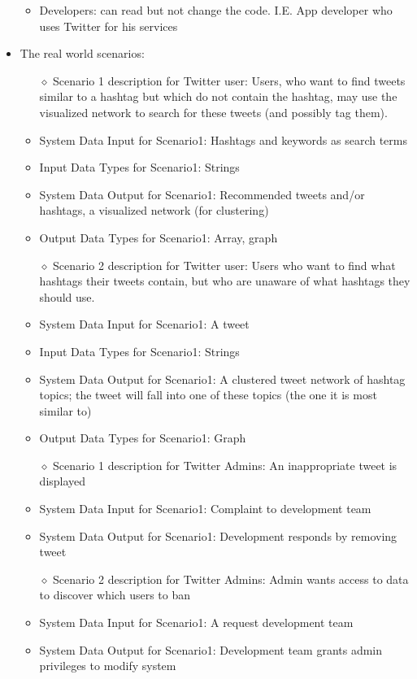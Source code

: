 \documentclass[10pt]{article}
\begin{document}
\begin{itemize}
\begin{itemize}
\item{Developers: can read but not change the code. I.E. App developer who uses Twitter for his services}

\end{itemize}
\item{The real world scenarios: }
	\begin{itemize} 
	\item[$\diamond$]{Scenario 1 description for Twitter user: }
	Users, who want to find tweets similar to a hashtag but which do not contain the hashtag, may use the visualized network to search for these tweets (and possibly tag them).
	\item{System Data Input for Scenario1: }
	Hashtags and keywords as search terms
	\item{Input Data Types for Scenario1: }
	Strings
	\item{System Data Output for Scenario1: }
	Recommended tweets and/or hashtags, a visualized network (for clustering)
	\item{Output Data Types for Scenario1: }
	Array, graph
	\end{itemize}

	\begin{itemize} 
	\item[$\diamond$]{Scenario 2 description for Twitter user: }
	Users who want to find what hashtags their tweets contain, but who are unaware of what hashtags they should use.
	\item{System Data Input for Scenario1: }
	A tweet
	\item{Input Data Types for Scenario1: }
	Strings
	\item{System Data Output for Scenario1: }
	A clustered tweet network of hashtag topics; the tweet will fall into one of these topics (the one it is most similar to)
	\item{Output Data Types for Scenario1: }
	Graph
	\end{itemize}

	\begin{itemize} 
	\item[$\diamond$]{Scenario 1 description for Twitter Admins: }
	An inappropriate tweet is displayed
	\item{System Data Input for Scenario1: }
	Complaint to development team
	\item{System Data Output for Scenario1: }
	Development responds by removing tweet
	\end{itemize}

	\begin{itemize} 
	\item[$\diamond$]{Scenario 2 description for Twitter Admins: }
	Admin wants access to data to discover which users to ban
	\item{System Data Input for Scenario1: }
	A request development team
	\item{System Data Output for Scenario1: }
	Development team grants admin privileges to modify system
	\end{itemize}


\end{itemize}
\end{document}
